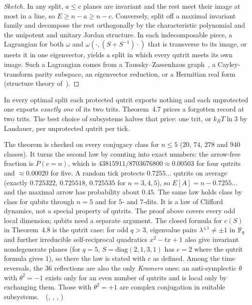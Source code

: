 \begin{proof}[Sketch]
In any split, $a\le c$ planes are invariant and the rest meet their image at most in a line, so $E\ge n-a\ge n-c$.
Conversely, split off a maximal invariant family and decompose the rest orthogonally by the characteristic polynomial
and the unipotent and unitary Jordan structure. In each indecomposable piece, a Lagrangian for both $\omega$ and
$\omega(\cdot,(S+S^{-1})\cdot)$ that is transverse to its image, or meets it in one eigenvector, yields a split in which
every qutrit meets its own image. Such a Lagrangian comes from a Taussky--Zassenhaus graph~\cite{TausskyZassenhaus1959},
a Cayley-transform parity subspace, an eigenvector reduction, or a Hermitian real form
(structure theory of~\cite{Wall1963,Milnor1969}).
\end{proof}

In every optimal split each protected qutrit exports nothing and each unprotected one exports \emph{exactly one} of its
two trits. Theorem~4.7 prices a forgotten record at two trits. The best choice of subsystems halves that price: one
trit, or $k_BT\ln3$ by Landauer, per unprotected qutrit per tick. \tierB

The theorem is checked on every conjugacy class for $n\le5$ ($20$, $74$, $278$ and $940$ classes). It turns the second law
by counting into exact numbers: the arrow-free fraction is $P(c=n)$, which is $43815911/8703676800\approx0.00503$ for
four qutrits and $\approx0.00020$ for five. A random tick protects $0.7255\ldots$ qutrits on average (exactly $0.725322$,
$0.725518$, $0.725535$ for $n=3,4,5$), so $E[A]=n-0.7255\ldots$ and the maximal arrow has probability about $0.45$. The
same law holds class by class for qubits through $n=5$ and for $5$- and $7$-dits. It is a law of Clifford dynamics, not
a special property of qutrits. The proof above covers every odd local dimension; qubits need a separate argument. The closed formula for $c(S)$ in Theorem~4.8 is the qutrit case: for odd $q>3$, eigenvalue pairs $\lambda^{\pm1}\neq\pm1$ in $\mathbb{F}_q$ and further irreducible self-reciprocal quadratics $x^2-tx+1$ also give invariant nondegenerate planes (for $q=5$, $S=\mathrm{diag}(2,1,3,1)$ has $c=2$ where the qutrit formula gives $1$), so there the law is stated with $c$ as defined.
Among the time reversals, the $36$ reflections are also the only \emph{Kramers} ones: an anti-symplectic $\theta$ with
$\theta^2=-1$ exists only for an even number of qutrits and is local only by exchanging them. Those with $\theta^2=+1$
are complex conjugation in suitable subsystems. \tierT\,\tierC\ (,
, ,
)

